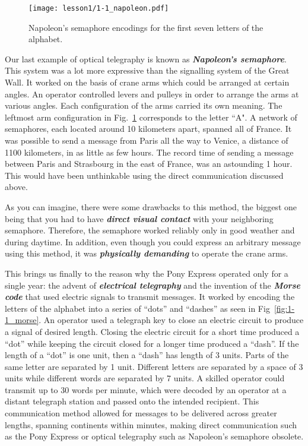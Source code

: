 \begin{figure}[t]
    \centering
    \texttt{[image: lesson1/1-1\_napoleon.pdf]}
    \caption[Napoleon's semaphore.]{Napoleon's semaphore encodings for the first seven letters of the alphabet.}
    \label{fig:1-1_napoleon}
\end{figure}

Our last example of optical telegraphy is known as \textit{\textbf{Napoleon's semaphore}}.
This system was a lot more expressive than the signalling system of the Great Wall.
It worked on the basis of crane arms which could be arranged at certain angles.
An operator controlled levers and pulleys in order to arrange the arms at various angles. Each configuration of the arms carried its own meaning.
The leftmost arm configuration in Fig.~\ref{fig:1-1_napoleon} corresponds to the letter ``A".
A network of semaphores, each located around 10 kilometers apart, spanned all of France.
It was possible to send a message from Paris all the way to Venice, a distance of 1100 kilometers, in as little as few hours.
The record time of sending a message between Paris and Strasbourg in the east of France, was an astounding 1 hour.
This would have been unthinkable using the direct communication discussed above.

As you can imagine, there were some drawbacks to this method, the biggest one being that you had to have \textit{\textbf{direct visual contact}} with your neighboring semaphore.
Therefore, the semaphore worked reliably only in good weather and during daytime.
In addition, even though you could express an arbitrary message using this method, it was \textit{\textbf{physically demanding}} to operate the crane arms.

This brings us finally to the reason why the Pony Express operated only for a single year: the advent of \textit{\textbf{electrical telegraphy}} and the invention of the \textit{\textbf{Morse code}} that used electric signals to transmit messages.
It worked by encoding the letters of the alphabet into a series of ``dots'' and ``dashes'' as seen in Fig~\ref{fig:1-1_morse}.
An operator used a telegraph key to close an electric circuit to produce a signal of desired length.
Closing the electric circuit for a short time produced a ``dot'' while keeping the circuit closed for a longer time produced a ``dash''.
If the length of a ``dot'' is one unit, then a ``dash'' has length of 3 units.
Parts of the same letter are separated by 1 unit.
Different letters are separated by a space of 3 units while different words are separated by 7 units.
A skilled operator could transmit up to 30 words per minute, which were decoded by an operator at a distant telegraph station and passed onto the intended recipient.
This communication method allowed for messages to be delivered across greater lengths, spanning continents within minutes, making direct communication such as the Pony Express or optical telegraphy such as Napoleon's semaphore obsolete.

